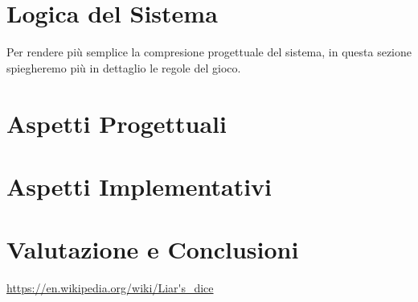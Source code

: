 \documentclass{llncs}
\begin{document}
	\section{Logica del Sistema}
		Per rendere più semplice la compresione progettuale del sistema, in questa sezione spiegheremo più in dettaglio le regole del gioco.  
	
	\section{Aspetti Progettuali}%
	
	
	\section{Aspetti Implementativi}%
	
	
	\section{Valutazione e Conclusioni}%
	

	\begin{thebibliography}{}
		 \url{https://en.wikipedia.org/wiki/Liar's\_dice}
		\bibitem{}
	\end{thebibliography}
\end{document}
